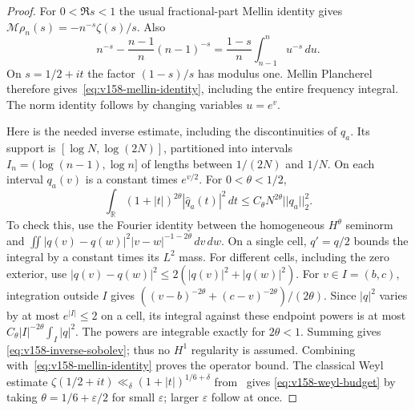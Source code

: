 \documentclass[11pt]{article}
\def\norm#1{||#1||}%
\theoremstyle{remark}
\newcommand{\norm}[1]{\left\lVert #1\right\rVert}
\begin{document}
\begin{proof}
For $0<\Re s<1$ the usual fractional-part Mellin identity gives
$\mathcal M\rho_n(s)=-n^{-s}\zeta(s)/s$. Also
\[
 n^{-s}-\frac{n-1}{n}(n-1)^{-s}
 =\frac{1-s}{n}\int_{n-1}^n u^{-s}\,du.
\]
On $s=1/2+it$ the factor $(1-s)/s$ has modulus one. Mellin Plancherel
therefore gives~\eqref{eq:v158-mellin-identity}, including the entire
frequency integral. The norm identity follows by changing variables
$u=e^v$.

Here is the needed inverse estimate, including the discontinuities of
$q_a$. Its support is $[\log N,\log(2N)]$, partitioned into intervals
$I_n=(\log(n-1),\log n]$ of lengths between $1/(2N)$ and $1/N$.
On each interval $q_a(v)$ is a constant times $e^{v/2}$. For
$0<\theta<1/2$,
\begin{equation}
 \int_{\mathbb R}(1+|t|)^{2\theta}|\widehat q_a(t)|^2\,dt
 \leq C_\theta N^{2\theta}\norm{q_a}_2^2.
 \label{eq:v158-inverse-sobolev}
\end{equation}
To check this, use the Fourier identity between the homogeneous
$H^\theta$ seminorm and
$\iint |q(v)-q(w)|^2|v-w|^{-1-2\theta}\,dv\,dw$.
On a single cell, $q'=q/2$ bounds the integral by a constant times its
$L^2$ mass. For different cells, including the zero exterior, use
$|q(v)-q(w)|^2\leq2(|q(v)|^2+|q(w)|^2)$.
For $v\in I=(b,c)$, integration outside $I$ gives
$((v-b)^{-2\theta}+(c-v)^{-2\theta})/(2\theta)$.
Since $|q|^2$ varies by at most $e^{|I|}\leq2$ on a cell, its integral
against these endpoint powers is at most
$C_\theta |I|^{-2\theta}\int_I|q|^2$.
The powers are integrable exactly for $2\theta<1$. Summing gives
\eqref{eq:v158-inverse-sobolev}; thus no $H^1$ regularity is assumed.
Combining with~\eqref{eq:v158-mellin-identity} proves the operator bound.
The classical Weyl estimate
$\zeta(1/2+it)\ll_\delta(1+|t|)^{1/6+\delta}$
from~\cite[Section 2]{HuxleyIvic2007} gives
\eqref{eq:v158-weyl-budget} by taking $\theta=1/6+\varepsilon/2$
for small $\varepsilon$; larger $\varepsilon$ follow at once.
\end{proof}
\end{document}

